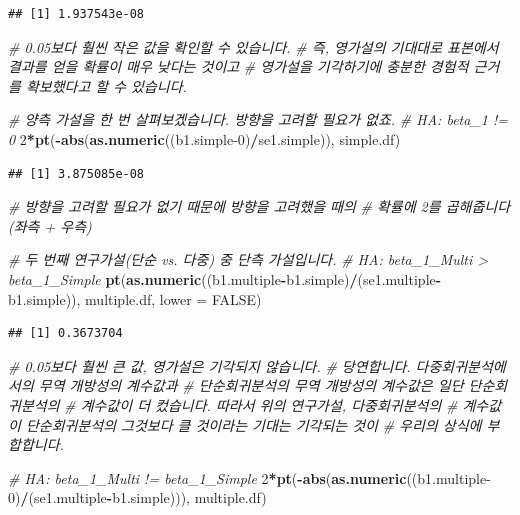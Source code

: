 \documentclass[
]{book}
\newenvironment{Shaded}{\begin{snugshade}}{\end{snugshade}}
\newcommand{\CommentTok}[1]{\textcolor[rgb]{0.56,0.35,0.01}{\textit{#1}}}
\newcommand{\DataTypeTok}[1]{\textcolor[rgb]{0.13,0.29,0.53}{#1}}
\newcommand{\DecValTok}[1]{\textcolor[rgb]{0.00,0.00,0.81}{#1}}
\newcommand{\KeywordTok}[1]{\textcolor[rgb]{0.13,0.29,0.53}{\textbf{#1}}}
\newcommand{\NormalTok}[1]{#1}
\newcommand{\OperatorTok}[1]{\textcolor[rgb]{0.81,0.36,0.00}{\textbf{#1}}}
\newcommand{\OtherTok}[1]{\textcolor[rgb]{0.56,0.35,0.01}{#1}}
\begin{document}
\begin{verbatim}
## [1] 1.937543e-08
\end{verbatim}

\begin{Shaded}
\begin{Highlighting}[]
\CommentTok{# 0.05보다 훨씬 작은 값을 확인할 수 있습니다.}
\CommentTok{# 즉, 영가설의 기대대로 표본에서 결과를 얻을 확률이 매우 낮다는 것이고}
\CommentTok{# 영가설을 기각하기에 충분한 경험적 근거를 확보했다고 할 수 있습니다.}

\CommentTok{# 양측 가설을 한 번 살펴보겠습니다. 방향을 고려할 필요가 없죠.}
\CommentTok{# HA: beta_1 != 0}
\DecValTok{2}\OperatorTok{*}\KeywordTok{pt}\NormalTok{(}\OperatorTok{-}\KeywordTok{abs}\NormalTok{(}\KeywordTok{as.numeric}\NormalTok{((b1.simple}\DecValTok{-0}\NormalTok{)}\OperatorTok{/}\NormalTok{se1.simple)), simple.df)}
\end{Highlighting}
\end{Shaded}

\begin{verbatim}
## [1] 3.875085e-08
\end{verbatim}

\begin{Shaded}
\begin{Highlighting}[]
\CommentTok{# 방향을 고려할 필요가 없기 때문에 방향을 고려했을 때의 }
\CommentTok{# 확률에 2를 곱해줍니다 (좌측 + 우측)}

\CommentTok{# 두 번째 연구가설(단순 vs. 다중) 중 단측 가설입니다.}
\CommentTok{# HA: beta_1_Multi > beta_1_Simple}
\KeywordTok{pt}\NormalTok{(}\KeywordTok{as.numeric}\NormalTok{((b1.multiple}\OperatorTok{-}\NormalTok{b1.simple)}\OperatorTok{/}\NormalTok{(se1.multiple}\OperatorTok{-}\NormalTok{b1.simple)), }
\NormalTok{   multiple.df, }\DataTypeTok{lower =} \OtherTok{FALSE}\NormalTok{)}
\end{Highlighting}
\end{Shaded}

\begin{verbatim}
## [1] 0.3673704
\end{verbatim}

\begin{Shaded}
\begin{Highlighting}[]
\CommentTok{# 0.05보다 훨씬 큰 값, 영가설은 기각되지 않습니다.}
\CommentTok{# 당연합니다. 다중회귀분석에서의 무역 개방성의 계수값과}
\CommentTok{# 단순회귀분석의 무역 개방성의 계수값은 일단 단순회귀분석의}
\CommentTok{# 계수값이 더 컸습니다. 따라서 위의 연구가설, 다중회귀분석의}
\CommentTok{# 계수값이 단순회귀분석의 그것보다 클 것이라는 기대는 기각되는 것이}
\CommentTok{# 우리의 상식에 부합합니다.}

\CommentTok{# HA: beta_1_Multi != beta_1_Simple}
\DecValTok{2}\OperatorTok{*}\KeywordTok{pt}\NormalTok{(}\OperatorTok{-}\KeywordTok{abs}\NormalTok{(}\KeywordTok{as.numeric}\NormalTok{((b1.multiple}\DecValTok{-0}\NormalTok{)}\OperatorTok{/}\NormalTok{(se1.multiple}\OperatorTok{-}\NormalTok{b1.simple))), multiple.df)}
\end{Highlighting}
\end{Shaded}
\end{document}
